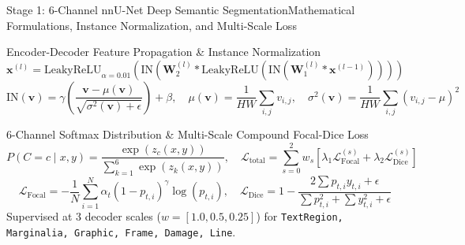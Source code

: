 \documentclass[aspectratio=169]{beamer}
\begin{document}
\begin{frame}{Stage 1: 6-Channel nnU-Net Deep Semantic Segmentation}{Mathematical Formulations, Instance Normalization, and Multi-Scale Loss}
\small
\setlength{\abovedisplayskip}{2pt}
\setlength{\belowdisplayskip}{2pt}

\begin{block}{Encoder-Decoder Feature Propagation \& Instance Normalization}
\footnotesize
\[
  \mathbf{x}^{(l)} = \text{LeakyReLU}_{\alpha=0.01}\left( \text{IN}\left( \mathbf{W}_2^{(l)} * \text{LeakyReLU}\left( \text{IN}\left( \mathbf{W}_1^{(l)} * \mathbf{x}^{(l-1)} \right) \right) \right) \right)
\]
\[
  \text{IN}(\mathbf{v}) = \gamma \left( \frac{\mathbf{v} - \mu(\mathbf{v})}{\sqrt{\sigma^2(\mathbf{v}) + \epsilon}} \right) + \beta, \quad \mu(\mathbf{v}) = \frac{1}{HW}\sum_{i,j} v_{i,j}, \quad \sigma^2(\mathbf{v}) = \frac{1}{HW}\sum_{i,j}(v_{i,j}-\mu)^2
\]
\end{block}

\vspace{-1.5mm}

\begin{block}{6-Channel Softmax Distribution \& Multi-Scale Compound Focal-Dice Loss}
\footnotesize
\[
  P(C = c \mid x, y) = \frac{\exp(z_c(x, y))}{\sum_{k=1}^{6} \exp(z_k(x, y))}, \quad \mathcal{L}_{\text{total}} = \sum_{s=0}^{2} w_s \left[ \lambda_1 \mathcal{L}_{\text{Focal}}^{(s)} + \lambda_2 \mathcal{L}_{\text{Dice}}^{(s)} \right]
\]
\[
  \mathcal{L}_{\text{Focal}} = -\frac{1}{N} \sum_{i=1}^N \alpha_t (1 - p_{t,i})^\gamma \log(p_{t,i}), \quad \mathcal{L}_{\text{Dice}} = 1 - \frac{2 \sum p_{t,i} y_{t,i} + \epsilon}{\sum p_{t,i}^2 + \sum y_{t,i}^2 + \epsilon}
\]
\vspace{1mm}
\scriptsize
Supervised at 3 decoder scales ($w = [1.0, 0.5, 0.25]$) for \texttt{TextRegion, Marginalia, Graphic, Frame, Damage, Line}.
\end{block}
\end{frame}
\end{document}
